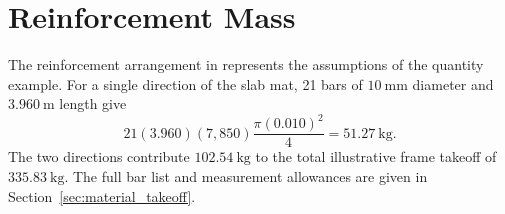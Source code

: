 \section{Reinforcement Mass}

The reinforcement arrangement in  represents the assumptions of the quantity example. For a single direction of the slab mat, 21 bars of \(10~\mathrm{mm}\) diameter and \(3.960~\mathrm{m}\) length give
\[
  21(3.960)(7{,}850)\frac{\pi(0.010)^2}{4}=51.27~\mathrm{kg}.
\]
The two directions contribute \(102.54~\mathrm{kg}\) to the total illustrative frame takeoff of \(335.83~\mathrm{kg}\). The full bar list and measurement allowances are given in Section~\ref{sec:material_takeoff}.
